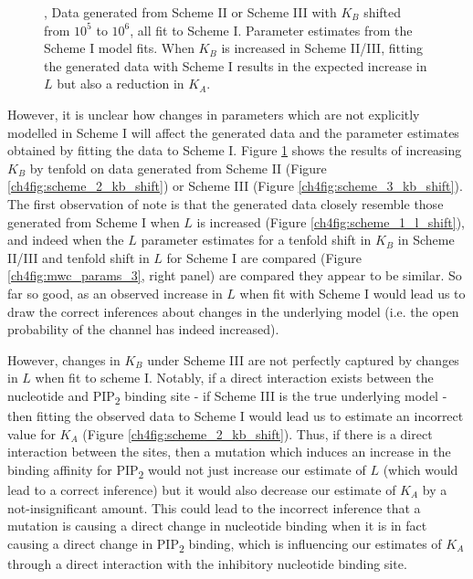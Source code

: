 \begin{figure}[hbtp]
\begin{subfigure}[t]{0.9\textwidth}
	\end{subfigure}
	\caption[Parameter retrieval from MWC models - complex schemes]{
	{\bf{}}
	,  Data generated from  Scheme II  or  Scheme III with $K_B$ shifted from $10^5$ to $10^6$, all fit to Scheme I.
	 Parameter estimates from the Scheme I model fits.
	When $K_B$ is increased in Scheme II/III, fitting the generated data with Scheme I results in the expected increase in $L$ but also a reduction in $K_A$.
	}\label{ch4fig:scheme_2_3_shifts}
\end{figure}

However, it is unclear how changes in parameters which are not explicitly modelled in Scheme I will affect the generated data and the parameter estimates obtained by fitting the data to Scheme I.
Figure \ref{ch4fig:scheme_2_3_shifts} shows the results of increasing $K_B$ by tenfold on data generated from Scheme II (Figure \ref{ch4fig:scheme_2_kb_shift}) or Scheme III (Figure \ref{ch4fig:scheme_3_kb_shift}).
The first observation of note is that the generated data closely resemble those generated from Scheme I when $L$ is increased (Figure \ref{ch4fig:scheme_1_l_shift}), and indeed when the $L$ parameter estimates for a tenfold shift in $K_B$ in Scheme II/III and tenfold shift in $L$ for Scheme I are compared (Figure \ref{ch4fig:mwc_params_3}, right panel) are compared they appear to be similar.
So far so good, as an observed increase in $L$ when fit with Scheme I would lead us to draw the correct inferences about changes in the underlying model (i.e. the open probability of the channel has indeed increased).

However, changes in $K_B$ under Scheme III are not perfectly captured by changes in $L$ when fit to scheme I.
Notably, if a direct interaction exists between the nucleotide and PIP\textsubscript{2} binding site - if Scheme III is the true underlying model - then fitting the observed data to Scheme I would lead us to estimate an incorrect value for $K_A$ (Figure \ref{ch4fig:scheme_2_kb_shift}).
Thus, if there is a direct interaction between the sites, then a mutation which induces an increase in the binding affinity for PIP\textsubscript{2} would not just increase our estimate of $L$ (which would lead to a correct inference) but it would also decrease our estimate of $K_A$ by a not-insignificant amount.
This could lead to the incorrect inference that a mutation is causing a direct change in nucleotide binding when it is in fact causing a direct change in PIP\textsubscript{2} binding, which is influencing our estimates of $K_A$ through a direct interaction with the inhibitory nucleotide binding site.


